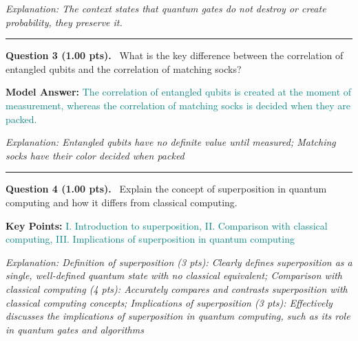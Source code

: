 \documentclass[12pt,a4paper]{article}
\begin{document}
\textit{\small Explanation: The context states that quantum gates do not destroy or create probability, they preserve it.}



\vspace{0.8em}
\noindent\rule{\linewidth}{0.2pt}
\vspace{0.3em}


\noindent
\textbf{Question 3 (1.00 pts).}~
What is the key difference between the correlation of entangled qubits and the correlation of matching socks?


\textbf{Model Answer:} \textcolor{teal}{The correlation of entangled qubits is created at the moment of measurement, whereas the correlation of matching socks is decided when they are packed.}



\textit{\small Explanation: Entangled qubits have no definite value until measured; Matching socks have their color decided when packed}



\vspace{0.8em}
\noindent\rule{\linewidth}{0.2pt}
\vspace{0.3em}


\noindent
\textbf{Question 4 (1.00 pts).}~
Explain the concept of superposition in quantum computing and how it differs from classical computing.


\textbf{Key Points:} \textcolor{teal}{I. Introduction to superposition, II. Comparison with classical computing, III. Implications of superposition in quantum computing}



\textit{\small Explanation: Definition of superposition (3 pts): Clearly defines superposition as a single, well-defined quantum state with no classical equivalent; Comparison with classical computing (4 pts): Accurately compares and contrasts superposition with classical computing concepts; Implications of superposition (3 pts): Effectively discusses the implications of superposition in quantum computing, such as its role in quantum gates and algorithms}
\end{document}
